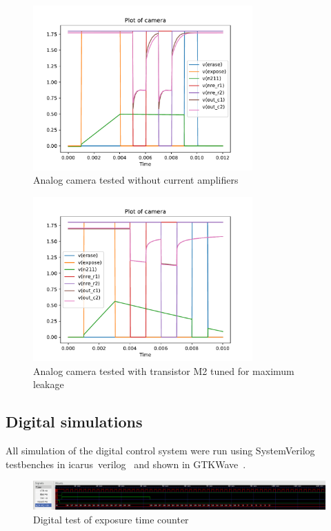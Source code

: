 \begin{figure}[htbp]
  \centering
  \includegraphics[width=0.75\textwidth]{../analog/camera4003nocurrentamp}
  \caption{Analog camera tested without current amplifiers}
  \label{fig:analog4003nocurrent}
\end{figure}

\begin{figure}[htbp]
  \centering
  \includegraphics[width=0.75\textwidth]{../analog/cameraLeakingM2}
  \caption{Analog camera tested with transistor M2 tuned for maximum leakage}
  \label{fig:analogLeakingM2}
\end{figure}




\subsection{Digital simulations}

All simulation of the digital control system were run using SystemVerilog testbenches in icarus~verilog~\cite{icarusVL} and shown in GTKWave~\cite{gtkwave}.


\begin{figure}[htbp]
  \centering
  \includegraphics[width=\textwidth]{figures/expTest}
  \caption{Digital test of exposure time counter}
  \label{fig:digexptest}
\end{figure}

